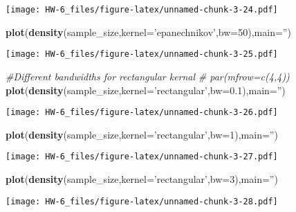 \documentclass[]{article}
\newenvironment{Shaded}{\begin{snugshade}}{\end{snugshade}}
\newcommand{\CommentTok}[1]{\textcolor[rgb]{0.56,0.35,0.01}{\textit{#1}}}
\newcommand{\DataTypeTok}[1]{\textcolor[rgb]{0.13,0.29,0.53}{#1}}
\newcommand{\DecValTok}[1]{\textcolor[rgb]{0.00,0.00,0.81}{#1}}
\newcommand{\FloatTok}[1]{\textcolor[rgb]{0.00,0.00,0.81}{#1}}
\newcommand{\KeywordTok}[1]{\textcolor[rgb]{0.13,0.29,0.53}{\textbf{#1}}}
\newcommand{\NormalTok}[1]{#1}
\newcommand{\StringTok}[1]{\textcolor[rgb]{0.31,0.60,0.02}{#1}}
\begin{document}
\texttt{[image: HW-6\_files/figure-latex/unnamed-chunk-3-24.pdf]}

\begin{Shaded}
\begin{Highlighting}[]
\KeywordTok{plot}\NormalTok{(}\KeywordTok{density}\NormalTok{(sample_size,}\DataTypeTok{kernel=}\StringTok{'epanechnikov'}\NormalTok{,}\DataTypeTok{bw=}\DecValTok{50}\NormalTok{),}\DataTypeTok{main=}\StringTok{''}\NormalTok{)}
\end{Highlighting}
\end{Shaded}

\texttt{[image: HW-6\_files/figure-latex/unnamed-chunk-3-25.pdf]}

\begin{Shaded}
\begin{Highlighting}[]
\CommentTok{#Different bandwidths for rectangular kernal}
\CommentTok{# par(mfrow=c(4,4))}
\KeywordTok{plot}\NormalTok{(}\KeywordTok{density}\NormalTok{(sample_size,}\DataTypeTok{kernel=}\StringTok{'rectangular'}\NormalTok{,}\DataTypeTok{bw=}\FloatTok{0.1}\NormalTok{),}\DataTypeTok{main=}\StringTok{''}\NormalTok{)}
\end{Highlighting}
\end{Shaded}

\texttt{[image: HW-6\_files/figure-latex/unnamed-chunk-3-26.pdf]}

\begin{Shaded}
\begin{Highlighting}[]
\KeywordTok{plot}\NormalTok{(}\KeywordTok{density}\NormalTok{(sample_size,}\DataTypeTok{kernel=}\StringTok{'rectangular'}\NormalTok{,}\DataTypeTok{bw=}\DecValTok{1}\NormalTok{),}\DataTypeTok{main=}\StringTok{''}\NormalTok{)}
\end{Highlighting}
\end{Shaded}

\texttt{[image: HW-6\_files/figure-latex/unnamed-chunk-3-27.pdf]}

\begin{Shaded}
\begin{Highlighting}[]
\KeywordTok{plot}\NormalTok{(}\KeywordTok{density}\NormalTok{(sample_size,}\DataTypeTok{kernel=}\StringTok{'rectangular'}\NormalTok{,}\DataTypeTok{bw=}\DecValTok{3}\NormalTok{),}\DataTypeTok{main=}\StringTok{''}\NormalTok{)}
\end{Highlighting}
\end{Shaded}

\texttt{[image: HW-6\_files/figure-latex/unnamed-chunk-3-28.pdf]}
\end{document}
